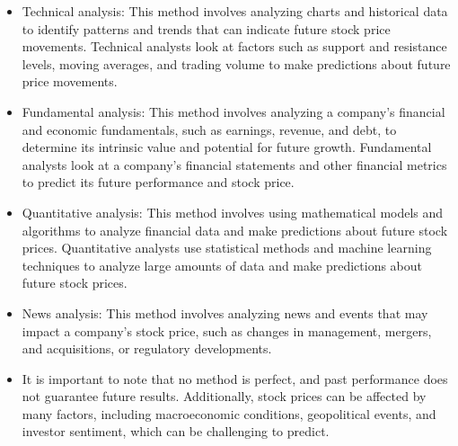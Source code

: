 \begin{itemize}
    \item Technical analysis: This method involves analyzing charts and historical data to identify patterns and trends that can indicate future stock price movements. Technical analysts look at factors such as support and resistance levels, moving averages, and trading volume to make predictions about future price movements.\cite{bib:technicalAnalysis} \cite{bib:techFundamentalAnalysis}
    \item Fundamental analysis: This method involves analyzing a company's financial and economic fundamentals, such as earnings, revenue, and debt, to determine its intrinsic value and potential for future growth. Fundamental analysts look at a company's financial statements and other financial metrics to predict its future performance and stock price.\cite{bib:techFundamentalAnalysis}
    \item Quantitative analysis: This method involves using mathematical models and algorithms to analyze financial data and make predictions about future stock prices. Quantitative analysts use statistical methods and machine learning techniques to analyze large amounts of data and make predictions about future stock prices.\cite{bib:quantitativeAnalysis}
    \item News analysis: This method involves analyzing news and events that may impact a company's stock price, such as changes in management, mergers, and acquisitions, or regulatory developments.\cite{bib:newsAnalysis}
    \item It is important to note that no method is perfect, and past performance does not guarantee future results. Additionally, stock prices can be affected by many factors, including macroeconomic conditions, geopolitical events, and investor sentiment, which can be challenging to predict.
\end{itemize} 

